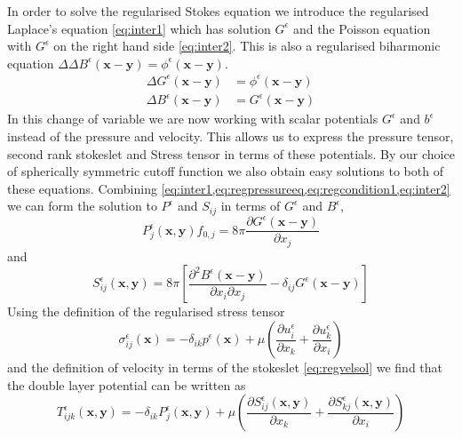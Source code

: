 In order to solve the regularised Stokes equation we introduce the regularised Laplace's equation \cref{eq:inter1} which has solution $G^\epsilon$ and the Poisson equation with $G^\epsilon$ on the right hand side \cref{eq:inter2}. This is also a regularised biharmonic equation $\Delta \Delta B^\epsilon  (\bm{x}-\bm{y}) = \phi^\epsilon(\bm{x}-\bm{y})$. 
\begin{subequations}
\label{eq:intermediate}
\begin{align}
    \Delta G^\epsilon(\bm{x}-\bm{y})  &= \phi^\epsilon(\bm{x}-\bm{y}) \label{eq:inter1} \\
    \Delta B^\epsilon(\bm{x}-\bm{y})  &= G^\epsilon(\bm{x}-\bm{y}) \label{eq:inter2}
\end{align}
\end{subequations}
In this change of variable we are now working with scalar potentials $G^\epsilon$ and $b^\epsilon$ instead of the pressure and velocity. This allows us to express the pressure tensor, second rank stokeslet and Stress tensor in terms of these potentials. By our choice of spherically symmetric cutoff function we also obtain easy solutions to both of these equations. Combining \cref{eq:inter1,eq:regpressureeq,eq:regcondition1,eq:inter2} we can form the solution to $P^\epsilon$ and $S_{ij}$ in terms of $G^\epsilon$ and $B^\epsilon$,
\begin{equation}
\label{eq:pressuresol}
    P^\epsilon_{j}(\bm{x},\bm{y})f_{0,j} = 8 \pi \frac{\partial G^\epsilon(\bm{x}-\bm{y})}{\partial x_j}
\end{equation}
and
\begin{equation}
\label{eq:regstokeslet1}
    S_{ij}^\epsilon(\bm{x}, \bm{y}) = 8\pi\left[ \frac{\partial^2 B^\epsilon(\bm{x} -\bm{y})}{\partial x_i \partial x_j} - \delta_{ij}  G^\epsilon(\bm{x} -\bm{y})\right]
\end{equation}
Using the definition of the regularised stress tensor 
\begin{equation}
\label{eq:regstress}
    \sigma_{ij}^\epsilon(\bm{x}) = -\delta_{ik}p^\epsilon(\bm{x}) + \mu\left( \frac{\partial u^\epsilon_i}{\partial x_k} + \frac{\partial u^\epsilon_k}{\partial x_i} \right)
\end{equation}
and the definition of velocity in terms of the stokeslet \cref{eq:regvelsol} we find that the double layer potential can be written as 
\begin{equation}
\label{eq:regDoubleLayerSol}
    T^\epsilon_{ijk}(\bm{x},\bm{y}) = -\delta_{ik} P^\epsilon_j(\bm{x},\bm{y}) + \mu\left( \frac{\partial S^\epsilon_{ij}(\bm{x},\bm{y})}{\partial x_k} + \frac{\partial S^\epsilon_{kj}(\bm{x},\bm{y})}{\partial x_i}\right)
\end{equation}

